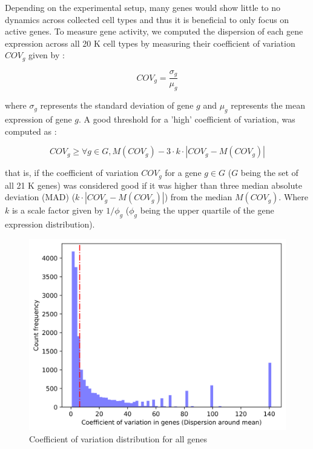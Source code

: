 Depending on the experimental setup, many genes would show little to no dynamics across collected cell types and thus it is beneficial to only focus on active genes. To measure gene activity, we computed the dispersion of each gene expression across all 20 K cell types by measuring their coefficient of variation $COV_g$ given by :

\begin{equation}
COV_g = \frac{\sigma_g}{\mu_g}
\end{equation}

where $\sigma_g$ represents the standard deviation of gene $g$ and $\mu_g$ represents the mean expression of gene $g$. A good threshold for a 'high' coefficient of variation, was computed as :

\begin{equation}
COV_g \geq \forall g \in G, M (COV_g) - 3 \cdot k \cdot | COV_g - M (COV_g) |
\end{equation}

that is, if the coefficient of variation $COV_g$ for a gene $g \in G$ ($G$ being the set of all 21 K genes) was considered good if it was higher than three median absolute deviation (MAD) ($k \cdot | COV_g - M (COV_g) |$) from the median $M (COV_g)$. Where $k$ is a scale factor given by $1 / \phi_g$ ($\phi_g$ being the upper quartile of the gene expression distribution).

\begin{figure}
\includegraphics[width=\linewidth]{sc_20k_mouse_neurons_coef_of_variation_cutoff.png}
\caption{Coefficient of variation distribution for all genes}
\end{figure}

